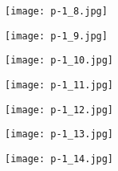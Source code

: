 \clearpage


\begin{figure}
    \begin{center}
        \texttt{[image: p-1\_8.jpg]}
        \caption{}
    \end{center}
\end{figure}

\clearpage


\begin{figure}
    \begin{center}
        \texttt{[image: p-1\_9.jpg]}
        \caption{}
    \end{center}
\end{figure}

\clearpage


\begin{figure}
    \begin{center}
        \texttt{[image: p-1\_10.jpg]}
        \caption{}
    \end{center}
\end{figure}

\clearpage


\begin{figure}
    \begin{center}
        \texttt{[image: p-1\_11.jpg]}
        \caption{}
    \end{center}
\end{figure}

\clearpage


\begin{figure}
    \begin{center}
        \texttt{[image: p-1\_12.jpg]}
        \caption{}
    \end{center}
\end{figure}

\clearpage


\begin{figure}
    \begin{center}
        \texttt{[image: p-1\_13.jpg]}
        \caption{}
    \end{center}
\end{figure}

\clearpage


\begin{figure}
    \begin{center}
        \texttt{[image: p-1\_14.jpg]}
        \caption{}
    \end{center}
\end{figure}


